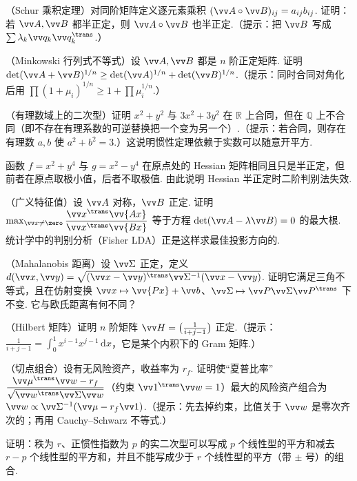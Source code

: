 {		\Cgroup
		\begin{exC}
			\item\label{ex:quad:C1} （Schur 乘积定理）对同阶矩阵定义逐元素乘积 $(\vv A\circ\vv B)_{ij}=a_{ij}b_{ij}$. 证明：若 $\vv A,\vv B$ 都半正定，则 $\vv A\circ\vv B$ 也半正定.（提示：把 $\vv B$ 写成 $\sum\lambda_k\vv q_k\vv q_k^\trans$.）
			\item\label{ex:quad:C2} （Minkowski 行列式不等式）设 $\vv A,\vv B$ 都是 $n$ 阶正定矩阵. 证明 $\det(\vv A+\vv B)^{1/n}\ge\det(\vv A)^{1/n}+\det(\vv B)^{1/n}$.（提示：同时合同对角化后用 $\prod(1+\mu_i)^{1/n}\ge1+\prod\mu_i^{1/n}$.）
			\item\label{ex:quad:C3} （有理数域上的二次型）证明 $x^2+y^2$ 与 $3x^2+3y^2$ 在 $\mathbb{R}$ 上合同，但在 $\mathbb{Q}$ 上不合同（即不存在有理系数的可逆替换把一个变为另一个）.（提示：若合同，则存在有理数 $a,b$ 使 $a^2+b^2=3$.）这说明惯性定理依赖于实数可以随意开平方.
			\item\label{ex:quad:C4} 函数 $f=x^2+y^4$ 与 $g=x^2-y^4$ 在原点处的 Hessian 矩阵相同且只是半正定，但前者在原点取极小值，后者不取极值. 由此说明 Hessian 半正定时二阶判别法失效.
			\item\label{ex:quad:C5} （广义特征值）设 $\vv A$ 对称，$\vv B$ 正定. 证明 $\max_{\vv x\ne\zero}\dfrac{\vv x^\trans\vv{Ax}}{\vv x^\trans\vv{Bx}}$ 等于方程 $\det(\vv A-\lambda\vv B)=0$ 的最大根. 统计学中的判别分析（Fisher LDA）正是这样求最佳投影方向的.
			\item\label{ex:quad:C6} （Mahalanobis 距离）设 $\vv\Sigma$ 正定，定义 $d(\vv x,\vv y)=\sqrt{(\vv x-\vv y)^\trans\vv\Sigma^{-1}(\vv x-\vv y)}$. 证明它满足三角不等式，且在仿射变换 $\vv x\mapsto\vv{Px}+\vv b$、$\vv\Sigma\mapsto\vv P\vv\Sigma\vv P^\trans$ 下不变. 它与欧氏距离有何不同？
			\item\label{ex:quad:C7} （Hilbert 矩阵）证明 $n$ 阶矩阵 $\vv H=\big(\frac1{i+j-1}\big)$ 正定.（提示：$\frac1{i+j-1}=\int_0^1x^{i-1}x^{j-1}\,\mathrm dx$，它是某个内积下的 Gram 矩阵.）
			\item\label{ex:quad:C8} （切点组合）设有无风险资产，收益率为 $r_f$. 证明使“夏普比率”$\dfrac{\vv\mu^\trans\vv w-r_f}{\sqrt{\vv w^\trans\vv\Sigma\vv w}}$（约束 $\vv 1^\trans\vv w=1$）最大的风险资产组合为 $\vv w\propto\vv\Sigma^{-1}(\vv\mu-r_f\vv 1)$.（提示：先去掉约束，比值关于 $\vv w$ 是零次齐次的；再用 Cauchy–Schwarz 不等式.）
			\item\label{ex:quad:C9} 证明：秩为 $r$、正惯性指数为 $p$ 的实二次型可以写成 $p$ 个线性型的平方和减去 $r-p$ 个线性型的平方和，并且不能写成少于 $r$ 个线性型的平方（带 $\pm$ 号）的组合.
		\end{exC}
	}
	
